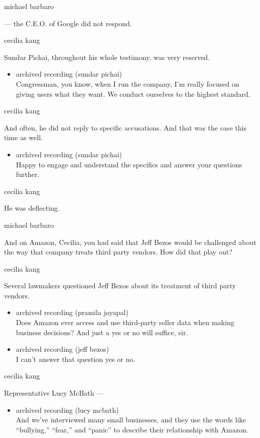 michael barbaro

--- the C.E.O. of Google did not respond.

cecilia kang

Sundar Pichai, throughout his whole testimony, was very reserved.

\begin{itemize}
\tightlist
\item
  archived recording (sundar pichai)\\
  Congressman, you know, when I run the company, I'm really focused on
  giving users what they want. We conduct ourselves to the highest
  standard.
\end{itemize}

cecilia kang

And often, he did not reply to specific accusations. And that was the
case this time as well.

\begin{itemize}
\tightlist
\item
  archived recording (sundar pichai)\\
  Happy to engage and understand the specifics and answer your questions
  further.
\end{itemize}

cecilia kang

He was deflecting.

michael barbaro

And on Amazon, Cecilia, you had said that Jeff Bezos would be challenged
about the way that company treats third party vendors. How did that play
out?

cecilia kang

Several lawmakers questioned Jeff Bezos about its treatment of third
party vendors.

\begin{itemize}
\item
  archived recording (pramila jayapal)\\
  Does Amazon ever access and use third-party seller data when making
  business decisions? And just a yes or no will suffice, sir.
\item
  archived recording (jeff bezos)\\
  I can't answer that question yes or no.
\end{itemize}

cecilia kang

Representative Lucy McBath ---

\begin{itemize}
\tightlist
\item
  archived recording (lucy mcbath)\\
  And we've interviewed many small businesses, and they use the words
  like ``bullying,'' ``fear,'' and ``panic'' to describe their
  relationship with Amazon.
\end{itemize}

